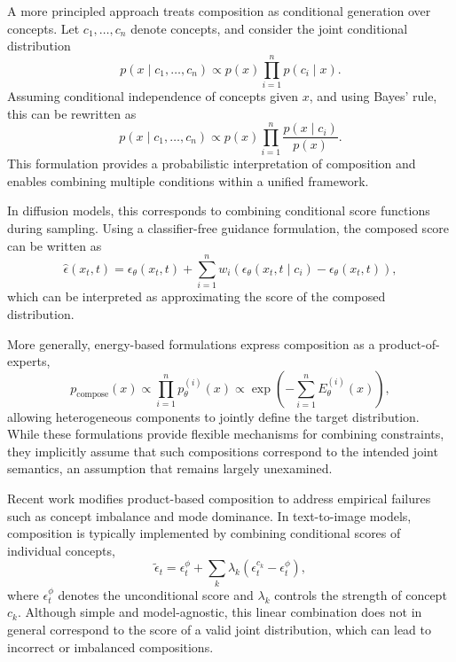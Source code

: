 \documentclass{article}
\begin{document}
A more principled approach treats composition as conditional generation over concepts. 
Let $c_1, \dots, c_n$ denote concepts, and consider the joint conditional distribution
\begin{equation}
p(x \mid c_1, \dots, c_n) \propto p(x)\prod_{i=1}^n p(c_i \mid x).
\end{equation}
Assuming conditional independence of concepts given $x$, and using Bayes' rule, this can be rewritten as
\begin{equation}
p(x \mid c_1, \dots, c_n) \propto p(x)\prod_{i=1}^n \frac{p(x \mid c_i)}{p(x)}.
\end{equation}
This formulation provides a probabilistic interpretation of composition and enables combining multiple conditions within a unified framework.

In diffusion models, this corresponds to combining conditional score functions during sampling. 
Using a classifier-free guidance formulation, the composed score can be written as
\begin{equation}
\hat{\epsilon}(x_t, t) = \epsilon_\theta(x_t, t) + \sum_{i=1}^n w_i \left( \epsilon_\theta(x_t, t \mid c_i) - \epsilon_\theta(x_t, t) \right),
\end{equation}
which can be interpreted as approximating the score of the composed distribution.

More generally, energy-based formulations express composition as a product-of-experts,
\begin{equation}
p_{\text{compose}}(x) \propto \prod_{i=1}^n p_\theta^{(i)}(x) \propto \exp\left(-\sum_{i=1}^n E_\theta^{(i)}(x)\right),
\end{equation}
allowing heterogeneous components to jointly define the target distribution. 
While these formulations provide flexible mechanisms for combining constraints, they implicitly assume that such compositions correspond to the intended joint semantics, an assumption that remains largely unexamined.

Recent work modifies product-based composition to address empirical failures such as concept imbalance and mode dominance. 
In text-to-image models, composition is typically implemented by combining conditional scores of individual concepts,
\begin{equation}
\tilde{\epsilon}_t = \epsilon_t^\phi + \sum_{k} \lambda_k \left(\epsilon_t^{c_k} - \epsilon_t^\phi \right),
\end{equation}
where $\epsilon_t^\phi$ denotes the unconditional score and $\lambda_k$ controls the strength of concept $c_k$. 
Although simple and model-agnostic, this linear combination does not in general correspond to the score of a valid joint distribution, which can lead to incorrect or imbalanced compositions.
\end{document}
